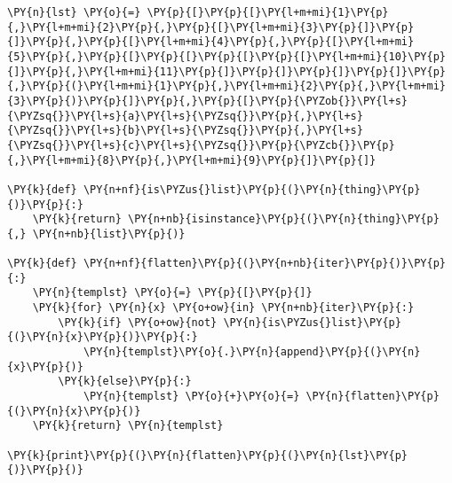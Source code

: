 \begin{Verbatim}[commandchars=\\\{\}]
\PY{n}{lst} \PY{o}{=} \PY{p}{[}\PY{p}{[}\PY{l+m+mi}{1}\PY{p}{,}\PY{l+m+mi}{2}\PY{p}{,}\PY{p}{[}\PY{l+m+mi}{3}\PY{p}{]}\PY{p}{]}\PY{p}{,}\PY{p}{[}\PY{l+m+mi}{4}\PY{p}{,}\PY{p}{[}\PY{l+m+mi}{5}\PY{p}{,}\PY{p}{[}\PY{p}{[}\PY{p}{[}\PY{p}{[}\PY{l+m+mi}{10}\PY{p}{]}\PY{p}{,}\PY{l+m+mi}{11}\PY{p}{]}\PY{p}{]}\PY{p}{]}\PY{p}{]}\PY{p}{,}\PY{p}{(}\PY{l+m+mi}{1}\PY{p}{,}\PY{l+m+mi}{2}\PY{p}{,}\PY{l+m+mi}{3}\PY{p}{)}\PY{p}{]}\PY{p}{,}\PY{p}{[}\PY{p}{\PYZob{}}\PY{l+s}{\PYZsq{}}\PY{l+s}{a}\PY{l+s}{\PYZsq{}}\PY{p}{,}\PY{l+s}{\PYZsq{}}\PY{l+s}{b}\PY{l+s}{\PYZsq{}}\PY{p}{,}\PY{l+s}{\PYZsq{}}\PY{l+s}{c}\PY{l+s}{\PYZsq{}}\PY{p}{\PYZcb{}}\PY{p}{,}\PY{l+m+mi}{8}\PY{p}{,}\PY{l+m+mi}{9}\PY{p}{]}\PY{p}{]}

\PY{k}{def} \PY{n+nf}{is\PYZus{}list}\PY{p}{(}\PY{n}{thing}\PY{p}{)}\PY{p}{:}
    \PY{k}{return} \PY{n+nb}{isinstance}\PY{p}{(}\PY{n}{thing}\PY{p}{,} \PY{n+nb}{list}\PY{p}{)}

\PY{k}{def} \PY{n+nf}{flatten}\PY{p}{(}\PY{n+nb}{iter}\PY{p}{)}\PY{p}{:}
    \PY{n}{templst} \PY{o}{=} \PY{p}{[}\PY{p}{]}
    \PY{k}{for} \PY{n}{x} \PY{o+ow}{in} \PY{n+nb}{iter}\PY{p}{:}
        \PY{k}{if} \PY{o+ow}{not} \PY{n}{is\PYZus{}list}\PY{p}{(}\PY{n}{x}\PY{p}{)}\PY{p}{:}
            \PY{n}{templst}\PY{o}{.}\PY{n}{append}\PY{p}{(}\PY{n}{x}\PY{p}{)}
        \PY{k}{else}\PY{p}{:}
            \PY{n}{templst} \PY{o}{+}\PY{o}{=} \PY{n}{flatten}\PY{p}{(}\PY{n}{x}\PY{p}{)}
    \PY{k}{return} \PY{n}{templst}

\PY{k}{print}\PY{p}{(}\PY{n}{flatten}\PY{p}{(}\PY{n}{lst}\PY{p}{)}\PY{p}{)}
\end{Verbatim}
